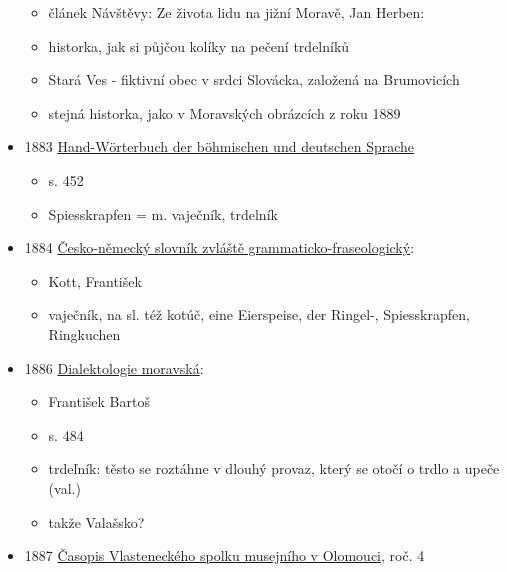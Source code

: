 \begin{itemize}
  \begin{itemize}
  \tightlist
  \item
    článek Návštěvy: Ze života lidu na jižní Moravě, Jan Herben:
  \item
    historka, jak si půjčou kolíky na pečení trdelníků
  \item
    Stará Ves - fiktivní obec v srdci Slovácka, založená na Brumovicích
  \item
    stejná historka, jako v Moravských obrázcích z roku 1889
  \end{itemize}
\item
  1883
  \href{https://www.google.cz/books/edition/Hand_W\%C3\%B6rterbuch_der_b\%C3\%B6hmischen_und_deu/c6KWlveere4C?hl=cs&gbpv=1&dq=trdeln\%C3\%ADk&pg=PA452&printsec=frontcover}{Hand-Wörterbuch
  der böhmischen und deutschen Sprache }

  \begin{itemize}
  \tightlist
  \item
    s. 452
  \item
    Spiesskrapfen = m. vaječník, trdelník
  \end{itemize}
\item
  1884
  \href{https://ndk.cz/uuid/uuid:78814bf1-f124-4c26-99b4-3ce6ef0458ea}{Česko-německý
  slovník zvláště grammaticko-fraseologický}:

  \begin{itemize}
  \tightlist
  \item
    Kott, František
  \item
    vaječník, na sl. též kotúč, eine Eierspeise, der Ringel-,
    Spiesskrapfen, Ringkuchen
  \end{itemize}
\item
  1886
  \href{https://www.google.cz/books/edition/Dialektologie_moravsk\%C3\%A1/IWowAQAAMAAJ?hl=cs&gbpv=1&dq=trdeln\%C3\%ADk&pg=RA1-PA484&printsec=frontcover}{Dialektologie
  moravská}:

  \begin{itemize}
  \tightlist
  \item
    František Bartoš
  \item
    s. 484
  \item
    trdeľník: těsto se roztáhne v dlouhý provaz, který se otočí o trdlo
    a upeče (val.)
  \item
    takže Valašsko?
  \end{itemize}
\item
  1887
  \href{https://ndk.cz/view/uuid:58907250-abd8-11dd-9aac-000d606f5dc6?page=uuid\%3Aadeec330-246a-11e9-bc55-5ef3fc9bb22f&fulltext=trdeln\%C3\%ADky}{Časopis
  Vlasteneckého spolku musejního v Olomouci}, roč. 4


\end{itemize}
